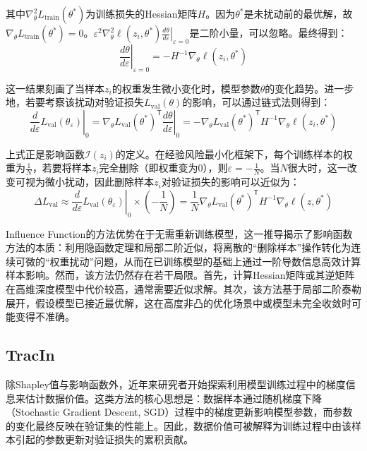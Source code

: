 其中$\nabla_{\theta}^2 L_{\mathrm{train}}(\theta^{*})$为训练损失的Hessian矩阵$H$。因为$\theta^{*}$是未扰动前的最优解，故\(\nabla_{\theta} L_{\mathrm{train}}(\theta^{*})=0\)。$\varepsilon^2\nabla_{\theta}^2 \ell(z_i, \theta^{*})\left.\frac{d\theta}{d\varepsilon}\right|_{\varepsilon=0}$是二阶小量，可以忽略。最终得到：
\begin{equation}
\left.\frac{d\theta}{d\varepsilon}\right|_{\varepsilon=0} = -H^{-1} \nabla_{\theta} \ell(z_i, \theta^{*})
\end{equation}

这一结果刻画了当样本$z_i$的权重发生微小变化时，模型参数$\theta$的变化趋势。进一步地，若要考察该扰动对验证损失$L_{\mathrm{val}}(\theta)$的影响，可以通过链式法则得到：
\begin{equation}
\left.\frac{d}{d\varepsilon} L_{\mathrm{val}}(\theta_{\varepsilon})\right|_{0} = \nabla_{\theta} L_{\mathrm{val}}(\theta^{*})^{\mathsf{T}} \left.\frac{d\theta}{d\varepsilon}\right|_{0}=-\nabla_{\theta} L_{\mathrm{val}}(\theta^{*})^{\mathsf{T}} H^{-1} \nabla_{\theta} \ell(z_i,\theta^{*})
\end{equation}

上式正是影响函数$\mathcal{I}(z_i)$的定义。在经验风险最小化框架下，每个训练样本的权重为$\frac{1}{N}$，若要将样本$z_i$完全删除（即权重变为0），则$\varepsilon=-\frac{1}{N}$。当$N$很大时，这一改变可视为微小扰动，因此删除样本$z_i$对验证损失的影响可以近似为：
\begin{equation}
\Delta L_{\mathrm{val}} \approx \left.\frac{d}{d\varepsilon} L_{\mathrm{val}}(\theta_{\varepsilon})\right|_{0} \times \left(-\frac{1}{N}\right)=\frac{1}{N} \nabla_{\theta} L_{\mathrm{val}}(\theta^{*})^{\mathsf{T}} H^{-1} \nabla_{\theta} \ell(z,\theta^{*})
\label{eq:influence}
\end{equation}

Influence Function的方法优势在于无需重新训练模型，这一推导揭示了影响函数方法的本质：利用隐函数定理和局部二阶近似，将离散的“删除样本”操作转化为连续可微的“权重扰动”问题，从而在已训练模型的基础上通过一阶导数信息高效计算样本影响。然而，该方法仍然存在若干局限。首先，计算Hessian矩阵或其逆矩阵在高维深度模型中代价较高，通常需要近似求解。其次，该方法基于局部二阶泰勒展开，假设模型已接近最优解，这在高度非凸的优化场景中或模型未完全收敛时可能变得不准确。

\subsection{TracIn}
除Shapley值与影响函数外，近年来研究者开始探索利用模型训练过程中的梯度信息来估计数据价值。这类方法的核心思想是：数据样本通过随机梯度下降（Stochastic Gradient Descent, SGD）过程中的梯度更新影响模型参数，而参数的变化最终反映在验证集的性能上。因此，数据价值可被解释为训练过程中由该样本引起的参数更新对验证损失的累积贡献。

